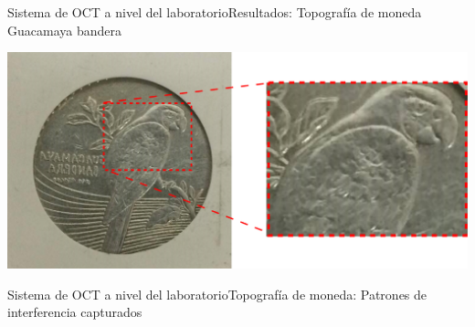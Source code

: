 \documentclass[fleqn,10pt]{beamer}
\begin{document}
\begin{frame}{Sistema de OCT a nivel del laboratorio}{Resultados: Topografía de moneda}
	Guacamaya bandera
	\begin{center}
		\includegraphics[width=1\linewidth]{AAUgraphics/pt2/Moneda_Directa_img}
	\end{center}
\end{frame}

%	
%	
%	

\begin{frame}{Sistema de OCT a nivel del laboratorio}{Topografía de moneda: Patrones de interferencia capturados}
	\begin{center}
	\end{center}
	
\end{frame}
\end{document}
